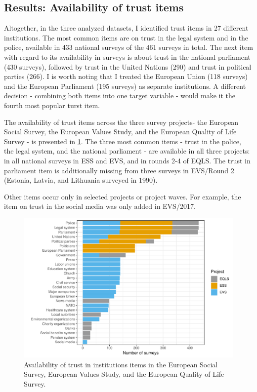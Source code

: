\documentclass[12pt,]{article}
\begin{document}
\hypertarget{results-availability-of-trust-items}{%
\subsection{Results: Availability of trust items}\label{results-availability-of-trust-items}}

Altogether, in the three analyzed datasets, I identified trust items in 27 different institutions. The most common items are on trust in the legal system and in the police, available in 433 national surveys of the 461 surveys in total. The next item with regard to its availability in surveys is about trust in the national parliament (430 surveys), followed by trust in the United Nations (290) and trust in political parties (266). I is worth noting that I treated the European Union (118 surveys) and the European Parliament (195 surveys) as separate institutions. A different decision - combining both items into one target variable - would make it the fourth most popular turst item.

The availability of trust items across the three survey projects- the European Social Survey, the European Values Study, and the European Quality of Life Survey - is presented in \ref{fig:trust-availability}. The three most common items - trust in the police, the legal system, and the national parliament - are available in all three projects: in all national surveys in ESS and EVS, and in rounds 2-4 of EQLS. The trust in parliament item is additionally missing from three surveys in EVS/Round 2 (Estonia, Latvia, and Lithuania surveyed in 1990).

Other items occur only in selected projects or project waves. For example, the item on trust in the social media was only added in EVS/2017.

\begin{figure}
\centering
\includegraphics{Harmonization_working_paper_files/figure-latex/trust-availability-1.pdf}
\caption{\label{fig:trust-availability}Availability of trust in institutions items in the European Social Survey, European Values Study, and the European Quality of Life Survey.}
\end{figure}
\end{document}
